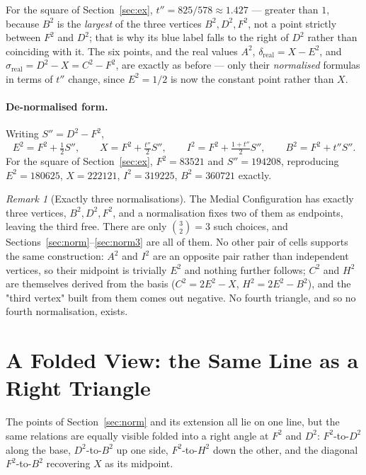\documentclass[12pt]{article}
\theoremstyle{remark}
\newtheorem{remark}[theorem]{Remark}
\begin{document}
For the square of Section~\ref{sec:ex}, $t'' = 825/578 \approx 1.427$
--- greater than $1$, because $B^2$ is the \emph{largest} of the three
vertices $B^2, D^2, F^2$, not a point strictly between $F^2$ and
$D^2$; that is why its blue label falls to the right of $D^2$ rather
than coinciding with it. The six points, and the real values $A^2$,
$\delta_{\text{real}} = X - E^2$, and
$\sigma_{\text{real}} = D^2-X = C^2-F^2$, are exactly as before ---
only their \emph{normalised} formulas in terms of $t''$ change, since
$E^2 = 1/2$ is now the constant point rather than $X$.

\paragraph{De-normalised form.}
Writing $S'' = D^2 - F^2$,
\[
E^2 = F^2 + \tfrac12 S'', \qquad
X = F^2 + \tfrac{t''}{2} S'', \qquad
I^2 = F^2 + \tfrac{1+t''}{2} S'', \qquad
B^2 = F^2 + t''S'' .
\]
For the square of Section~\ref{sec:ex}, $F^2 = 83521$ and
$S'' = 194208$, reproducing $E^2 = 180625$, $X = 222121$,
$I^2 = 319225$, $B^2 = 360721$ exactly.

\begin{remark}[Exactly three normalisations]
The Medial Configuration has exactly three vertices, $B^2, D^2, F^2$,
and a normalisation fixes two of them as endpoints, leaving the third
free. There are only $\binom{3}{2} = 3$ such choices, and
Sections~\ref{sec:norm}--\ref{sec:norm3} are all of them. No other
pair of cells supports the same construction: $A^2$ and $I^2$ are an
opposite pair rather than independent vertices, so their midpoint is
trivially $E^2$ and nothing further follows; $C^2$ and $H^2$ are
themselves derived from the basis ($C^2 = 2E^2 - X$,
$H^2 = 2E^2 - B^2$), and the "third vertex" built from them comes out
negative. No fourth triangle, and so no fourth normalisation, exists.
\end{remark}

\section{A Folded View: the Same Line as a Right Triangle}\label{sec:folded}

The points of Section~\ref{sec:norm} and its extension all lie on one
line, but the same relations are equally visible folded into a right
angle at $F^2$ and $D^2$: $F^2$-to-$D^2$ along the base, $D^2$-to-$B^2$
up one side, $F^2$-to-$H^2$ down the other, and the diagonal
$F^2$-to-$B^2$ recovering $X$ as its midpoint.
\end{document}
